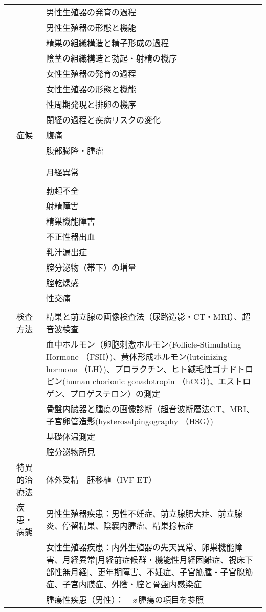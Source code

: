 \begin{xltabular}{\linewidth}{XXX}
 &  & 男性生殖器の発育の過程 \\
 &  & 男性生殖器の形態と機能 \\
 &  & 精巣の組織構造と精子形成の過程 \\
 &  & 陰茎の組織構造と勃起・射精の機序 \\
 &  & 女性生殖器の発育の過程 \\
 &  & 女性生殖器の形態と機能 \\
 &  & 性周期発現と排卵の機序 \\
 &  & 閉経の過程と疾病リスクの変化 \\
 & 症候 & 腹痛 \\
 &  & 腹部膨隆・腫瘤 \\
 &  &  \\
 &  &  \\
 &  & 月経異常 \\
 &  &  \\
 &  & 勃起不全 \\
 &  & 射精障害 \\
 &  & 精巣機能障害 \\
 &  & 不正性器出血 \\
 &  & 乳汁漏出症 \\
 &  & 腟分泌物（帯下）の増量 \\
 &  & 腟乾燥感 \\
 &  & 性交痛 \\
 &  &  \\
 & 検査方法 & 精巣と前立腺の画像検査法（尿路造影・CT・MRI）、超音波検査 \\
 &  & 血中ホルモン（卵胞刺激ホルモン(Follicle-Stimulating Hormone （FSH）)、黄体形成ホルモン(luteinizing hormone （LH）)、プロラクチン、ヒト絨毛性ゴナドトロピン(human chorionic gonadotropin （hCG）)、エストロゲン、プロゲステロン）の測定 \\
 &  & 骨盤内臓器と腫瘍の画像診断（超音波断層法CT、MRI、子宮卵管造影(hysterosalpingography （HSG）) \\
 &  & 基礎体温測定 \\
 &  & 腟分泌物所見 \\
 & 特異的治療法 & 体外受精―胚移植（IVF-ET） \\
 & 疾患・病態 & 男性生殖器疾患：男性不妊症、前立腺肥大症、前立腺炎、停留精巣、陰嚢内腫瘤、精巣捻転症 \\
 &  & 女性生殖器疾患：内外生殖器の先天異常、卵巣機能障害、月経異常[月経前症候群・機能性月経困難症、視床下部性無月経]、更年期障害、不妊症、子宮筋腫・子宮腺筋症、子宮内膜症、外陰・腟と骨盤内感染症 \\
 &  & 腫瘍性疾患（男性）：　※腫瘍の項目を参照 \\

\end{xltabular}
